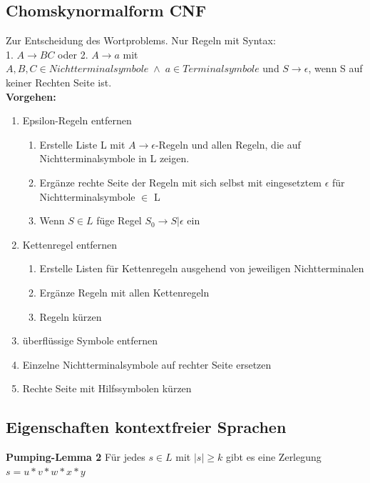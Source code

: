 \documentclass[12pt,a4paper]{article}
\begin{document}
	\subsection{Chomskynormalform CNF}
	Zur Entscheidung des Wortproblems. Nur Regeln mit Syntax: \\
	1. $A \rightarrow BC$ oder 2. $A \rightarrow a$ mit $A,B,C \in Nichtterminalsymbole \; \wedge \; a \in Terminalsymbole$ und $S \rightarrow \epsilon$, wenn S auf keiner Rechten Seite ist.\\
	\textbf{Vorgehen:}
	\begin{enumerate}
		\item Epsilon-Regeln entfernen
		\begin{enumerate}
			\item Erstelle Liste L mit $A\rightarrow \epsilon$-Regeln und allen Regeln, die auf Nichtterminalsymbole in L zeigen.
			\item Ergänze rechte Seite der Regeln mit sich selbst mit eingesetztem $\epsilon$ für Nichtterminalsymbole $\in$ L
			\item Wenn $S \in L$ füge Regel $S_0 \rightarrow S | \epsilon$ ein
		\end{enumerate}
		\item Kettenregel entfernen
		\begin{enumerate}
			\item Erstelle Listen für Kettenregeln ausgehend von jeweiligen Nichtterminalen
			\item Ergänze Regeln mit allen Kettenregeln
			\item Regeln kürzen
		\end{enumerate}
		\item überflüssige Symbole entfernen
		\item Einzelne Nichtterminalsymbole auf rechter Seite ersetzen 
		\item Rechte Seite mit Hilfssymbolen kürzen
	\end{enumerate}
	
	\subsection{Eigenschaften kontextfreier Sprachen}
	
	\textbf{Pumping-Lemma 2}\newline
	Für jedes $s \in L$ mit $|s| \geq k$ gibt es eine Zerlegung $s = u*v *w*x*y$
	
\end{document}
